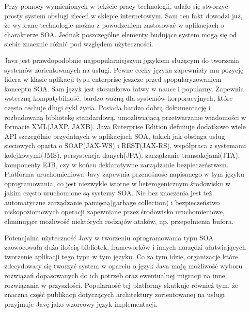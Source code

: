 
\label{sec:uzytecznosc}

Przy pomocy wymienionych w tekście pracy technologii, udało się stworzyć prosty system obsługi zleceń w sklepie internetowym. Sam ten fakt dowodzi już, że wybrane technologie można z powodzeniem zastosować w aplikacjach o charakterze SOA. Jednak poszczególne elementy budujące system mogą się od siebie znacznie różnić pod względem użyteczności.

Java jest prawdopodobnie najpopularniejszym językiem służącym do tworzenia systemów zorientowanych na usługi. Pewne cechy języka zapewniały mu pozycję lidera w klasie aplikacji typu enterprise jeszcze przed spopularyzowaniem konceptu SOA. Sam język jest stosunkowo łatwy w nauce i popularny. Zapewnia wsteczną kompatybilność, bardzo ważną dla systemów korporacyjnych, które często cechuje długi cykl życia. Posiada bardzo dobrą dokumentację i rozbudowaną bibliotekę standardową, umożliwiającą przetwarzanie wiadomości w formacie XML(JAXP, JAXB). Java Enterprise Edition definiuje dodatkowo wiele API szczególnie przydatnych w aplikacjach SOA, takich jak obsługa usług sieciowych oparta o SOAP(JAX-WS) i REST(JAX-RS), współpraca z systemami kolejkowymi(JMS), persystencja danych(JPA), zarządzanie transakcjami(JTA), komponenty EJB, czy w końcu deklaratywne zarządzanie bezpieczeństwem. Platforma uruchomieniowa Javy zapewnia przenośność napisanego w tym języku oprogramowania, co jest niezwykle istotne w heterogenicznym środowisku w jakim często uruchomione są systemy SOA. Nie bez znaczenia jest też automatyczne zarządzanie pamięcią(garbage collection) i bezpieczeństwo niskopoziomowych operacji zapewniane przez środowisko uruchomieniowe, eliminujące możliwość niektórych rodzajów ataków, np. przepełnienia bufora. 

Potencjalna użyteczność Javy w tworzeniu oprogramowania typu SOA zaowocowała duża ilością bibliotek, frameworków i innych narzędzi ułatwiających tworzenie aplikacji tego typu w tym języku. Co za tym idzie, organizacje które zdecydowały się tworzyć system w oparciu o język Java mają możliwość wyboru rozwiązań dopasowanych do ich potrzeb oraz ewentualnej migracji na inne rozwiązania w przyszłości. Popularność tej platformy skutkuje również tym, że znaczna część publikacji dotyczących architektury zorientowanej na usługi przyjmuje Javę jako wzorcowy język implementacji.

